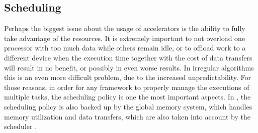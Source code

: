 \documentclass[main.tex]{subfiles}
\begin{document}
\subsection{Scheduling}

Perhaps the biggest issue about the usage of accelerators is the ability to fully take advantage of the resources. It is extremely important to not overload one processor with too much data while others remain idle, or to offload work to a different device when the execution time together with the cost of data transfers will result in no benefit, or possibly in even worse results. In irregular algorithms this is an even more difficult problem, due to the increased unpredictability.
For those reasons, in order for any \hetplat framework to properly manage the executions of multiple tasks, the scheduling policy is one the most important aspects. In \gama, the scheduling policy is also backed up by the global memory system, which handles memory utilization and data transfers, which are also taken into account by the scheduler \cite{thesisMariano12,artur2012gama,ricardo2012gama}.
\end{document}
